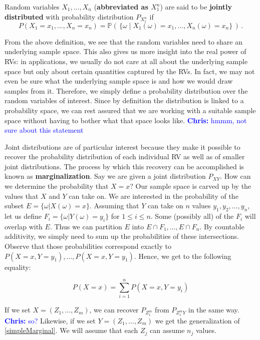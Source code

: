 \documentclass[a4paper,11pt,leqno]{report}
\newcommand{\chris}[1]{ \textcolor{blue}{\textbf{Chris:} #1}}
\begin{document}
\begin{Definition}
Random variables $ X_{1}, \ldots, X_{n} $ (\textbf{abbreviated as $ X^{n}_{1} $}) 
are said to be \textbf{jointly distributed} with probability distribution $ P_{X_{1}^{n}} $ if
$$ P(X_{1}=x_{1}, \ldots, X_{n}=x_{n}) = \mathbb{P}(\, \{\omega \mid
X_{1}(\omega) = x_{1}, \ldots, X_{n}(\omega)=x_{n}\}\, ) \, . $$ 
\end{Definition}

From the above definition, we see that the random variables need to
share an underlying sample space. This also gives us more insight into
the real power of RVs: in applications, we usually do not care at all
about the underlying sample space but only about certain quantities
captured by the RVs. In fact, we may not even be sure what the
underlying sample space is and how we would draw samples from
it. Therefore, we simply define a probability distribution over the
random variables of interest. Since by definition the distribution is
linked to a probability space, we can rest assured that we are working
with a suitable sample space without having to bother what that space
looks like. \chris{hmmm, not sure about this statement}

Joint distributions are of particular interest because they make it possible to recover the probability distribution of each individual
RV as well as of smaller joint distributions. The process by which this recovery can be accomplished is known as \textbf{marginalization}. Say
we are given a joint distribution $ P_{XY} $. How can we determine the probability that $ X=x $? Our sample space is carved
up by the values that $ X $ and $ Y $ can take on. We are interested in the probability of the subset $ E = \{\omega|X(\omega)=x\} $.
Assuming that $ Y $ can take on $ n $ values $y_1,y_2,\ldots,y_n$, let us define $ F_{i} = \{\omega| Y(\omega) = y_{i}\} $ for $ 1 \leq i \leq n $.
Some (possibly all) of the $ F_{i} $ will overlap with $ E $. Thus we can partition $ E $ into $ E\cap F_{1}, \ldots, E \cap F_{n} $.
By countable additivity, we simply need to sum up the probabilities of these intersections. Observe that those probabilities correspond exactly to $ P(X=x,Y=y_{1}), \ldots, P(X=x,Y=y_{1}) $. Hence, we get to the following equality:

\begin{equation} \label{simpleMarginal}
P(X=x) = \overset{n}{\underset{i=1}{\sum}} P(X=x,Y=y_{i}) 
\end{equation}

If we set $ X = (Z_{1}, \ldots, Z_{m}) $, we can recover $ P_{Z_{1}^{m}} $ from $ P_{Z_{1}^{m}Y} $ in the same way.\chris{so?} Likewise,
if we set $ Y = (Z_{1}, \ldots, Z_{m}) $ we get the generalization of \eqref{simpleMarginal}. We will assume that each $ Z_{j} $
can assume $ n_{j} $ values.
\end{document}
